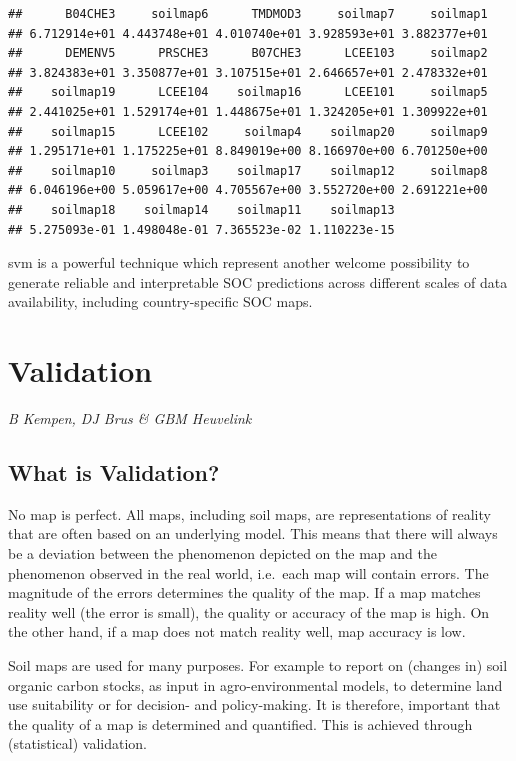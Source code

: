 \documentclass[10pt,b5paper,]{book}
\theoremstyle{definition}
\theoremstyle{definition}
\theoremstyle{definition}
\theoremstyle{remark}
\begin{document}
\begin{verbatim}
##      B04CHE3     soilmap6      TMDMOD3     soilmap7     soilmap1 
## 6.712914e+01 4.443748e+01 4.010740e+01 3.928593e+01 3.882377e+01 
##      DEMENV5      PRSCHE3      B07CHE3      LCEE103     soilmap2 
## 3.824383e+01 3.350877e+01 3.107515e+01 2.646657e+01 2.478332e+01 
##    soilmap19      LCEE104    soilmap16      LCEE101     soilmap5 
## 2.441025e+01 1.529174e+01 1.448675e+01 1.324205e+01 1.309922e+01 
##    soilmap15      LCEE102     soilmap4    soilmap20     soilmap9 
## 1.295171e+01 1.175225e+01 8.849019e+00 8.166970e+00 6.701250e+00 
##    soilmap10     soilmap3    soilmap17    soilmap12     soilmap8 
## 6.046196e+00 5.059617e+00 4.705567e+00 3.552720e+00 2.691221e+00 
##    soilmap18    soilmap14    soilmap11    soilmap13 
## 5.275093e-01 1.498048e-01 7.365523e-02 1.110223e-15
\end{verbatim}

svm is a powerful technique which represent another welcome possibility
to generate reliable and interpretable SOC predictions across different
scales of data availability, including country-specific SOC maps.

\hypertarget{chvalidation}{%
\chapter{Validation}\label{chvalidation}}

\emph{B Kempen, DJ Brus \& GBM Heuvelink}

\hypertarget{what-is-validation}{%
\section{What is Validation?}\label{what-is-validation}}

No map is perfect. All maps, including soil maps, are representations of
reality that are often based on an underlying model. This means that
there will always be a deviation between the phenomenon depicted on the
map and the phenomenon observed in the real world, i.e.~each map will
contain errors. The magnitude of the errors determines the quality of
the map. If a map matches reality well (the error is small), the quality
or accuracy of the map is high. On the other hand, if a map does not
match reality well, map accuracy is low.

Soil maps are used for many purposes. For example to report on (changes
in) soil organic carbon stocks, as input in agro-environmental models,
to determine land use suitability or for decision- and policy-making. It
is therefore, important that the quality of a map is determined and
quantified. This is achieved through (statistical) validation.
\end{document}
